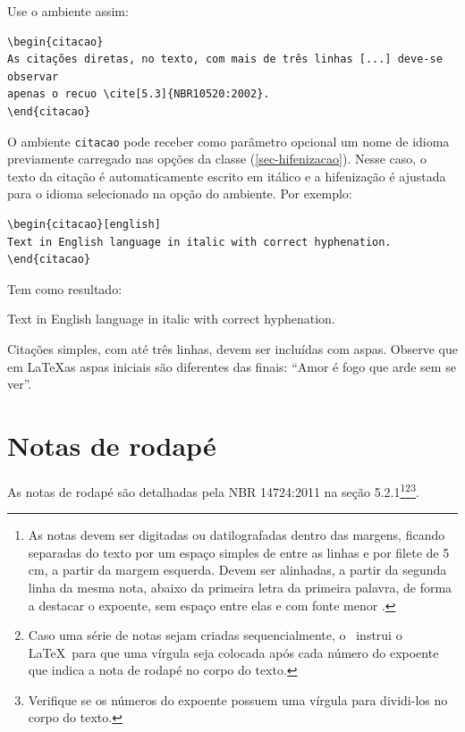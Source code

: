 Use o ambiente assim:

\begin{verbatim}
\begin{citacao}
As citações diretas, no texto, com mais de três linhas [...] deve-se observar
apenas o recuo \cite[5.3]{NBR10520:2002}.
\end{citacao}
\end{verbatim}

O ambiente \texttt{citacao} pode receber como parâmetro opcional um nome de
idioma previamente carregado nas opções da classe (\autoref{sec-hifenizacao}). Nesse
caso, o texto da citação é automaticamente escrito em itálico e a hifenização é
ajustada para o idioma selecionado na opção do ambiente. Por exemplo:

\begin{verbatim}
\begin{citacao}[english]
Text in English language in italic with correct hyphenation.
\end{citacao}
\end{verbatim}

Tem como resultado:

\begin{citacao}[english]
Text in English language in italic with correct hyphenation.
\end{citacao}

Citações simples, com até três linhas, devem ser
incluídas com aspas. Observe que em \LaTeX as aspas iniciais são diferentes das
finais: ``Amor é fogo que arde sem se ver''.

\section{Notas de rodapé}

As notas de rodapé são detalhadas pela NBR 14724:2011 na seção 5.2.1\footnote{As
notas devem ser digitadas ou datilografadas dentro das margens, ficando
separadas do texto por um espaço simples de entre as linhas e por filete de 5
cm, a partir da margem esquerda. Devem ser alinhadas, a partir da segunda linha
da mesma nota, abaixo da primeira letra da primeira palavra, de forma a destacar
o expoente, sem espaço entre elas e com fonte menor
.}\footnote{Caso uma série de notas sejam
criadas sequencialmente, o \abnTeX\ instrui o \LaTeX\ para que uma vírgula seja
colocada após cada número do expoente que indica a nota de rodapé no corpo do
texto.}\footnote{Verifique se os números do expoente possuem uma vírgula para
dividi-los no corpo do texto.}. 



